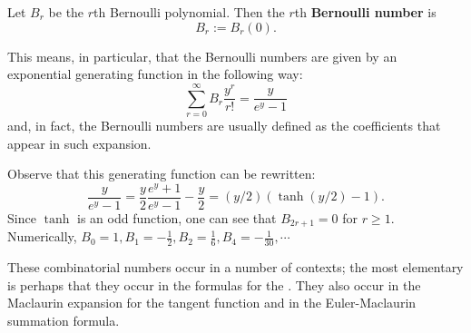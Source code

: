 \documentclass[12pt]{article}
\begin{document}
Let $B_r$ be the $r$th Bernoulli polynomial. Then the $r$th {\bf Bernoulli number} is
\[ 
B_r := B_r(0). 
\]

This means, in particular, that the Bernoulli numbers are given by an exponential generating function in the following way:
\[
\sum_{r=0}^{\infty} B_r \frac{y^r}{r!} = \frac{y}{e^y-1} 
\]
and, in fact, the Bernoulli numbers are usually defined as the coefficients that appear in such expansion.

Observe that this generating function can be rewritten:
\[
\frac{y}{e^y-1} = \frac{y}{2}\frac{e^y+1}{e^y-1} - \frac{y}{2} = (y/2)(\operatorname{tanh}(y/2) -1).
\]
 Since $\operatorname{tanh}$ is an odd function, one can see that $B_{2r+1}=0$ for $r \geq 1$. Numerically, $B_0 = 1, B_1 = -\frac{1}{2}, B_2 = \frac{1}{6}, B_4 = -\frac{1}{30}, \cdots$

These combinatorial numbers occur in a number of contexts; the most elementary is perhaps that they occur in the formulas for the .  They also occur in the Maclaurin expansion for the tangent function and in the Euler-Maclaurin summation formula.
\end{document}
